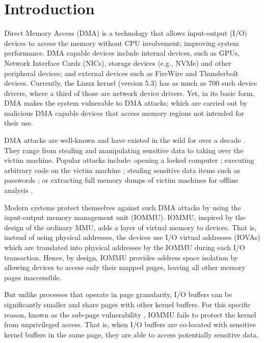 \section{Introduction}

Direct Memory Access (DMA) is a technology that allows input-output (I/O) devices to access the memory without CPU involvement; improving system performance.
DMA capable devices include internal devices, such as GPUs, Network Interface Cards (NICs), storage devices (e.g., NVMe) and other peripheral devices; and external devices such as FireWire and Thunderbolt devices. Currently, the Linux kernel (version 5.3) has as much as 700 such device drivers, where a third of those are network device drivers. Yet, in its basic form, DMA makes the system vulnerable to DMA attacks; which are carried out by malicious DMA capable devices that access memory regions not intended for their use. 



DMA attacks are well-known and have existed in the wild for over a decade \cite{Dor04,BDK10,thunder}. They range from stealing and manipulating sensitive data to taking over the victim machine. Popular attacks include: opening a locked computer \cite{MM, Fin14}; executing arbitrary code on the victim machine \cite{Fri16, Woj08, AD10,thunder}; stealing sensitive data items such as passwords \cite{SB12, LKV13, Cim16, BR12}; or extracting full memory dumps of victim machines for offline analysis \cite{MM, Vol, Fin14, GA10}. 

Modern systems protect themselves against such DMA attacks by using the input-output memory management unit (IOMMU). IOMMU, inspired by the design of the ordinary MMU, adds a layer of virtual memory to devices. That is, instead of using physical addresses, the devices use I/O virtual addresses (IOVAs) which are translated into physical addresses by the IOMMU during each I/O transaction. Hence, by design, IOMMU provides address space isolation by allowing devices to access only their mapped pages, leaving all other memory pages inaccessible. 

But unlike processes that operate in page granularity, I/O buffers can be significantly smaller and share pages with other kernel buffers. For this specific reason, known as the sub-page vulnerability \cite{MMT16,thunder}, IOMMU fails to protect the kernel from unprivileged access. That is, when I/O buffers are co-located with sensitive kernel buffers in the same page, they are able to access potentially sensitive data. 

